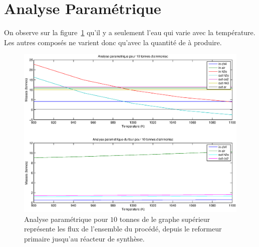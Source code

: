 \section{Analyse Paramétrique}

On observe sur la figure~\ref{fig:analyseParam} qu'il y a seulement l'eau 
qui varie avec la température.
Les autres composés ne varient donc qu'avec la quantité de  à produire.

\begin{figure}[h!]
	\begin{center}
		\includegraphics[scale=0.5]{../tache1/img/analyseParam.eps}
	\end{center}
	\caption{Analyse paramétrique pour $10$ tonnes de 
		le graphe supérieur représente les flux de l'ensemble du 
		procédé, depuis le reformeur primaire jusqu'au réacteur de synthèse.}
	\label{fig:analyseParam}
\end{figure}


